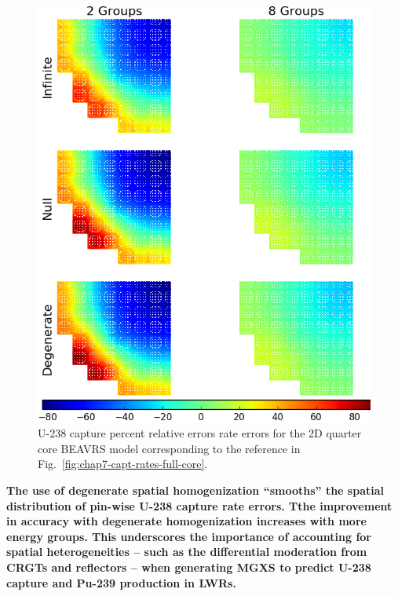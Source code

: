 \begin{figure}[h!]
\centering
\includegraphics[width=\linewidth]{figures/quantification/full-core/capt-err}
\caption[U-238 capture rate errors for the 2D quarter core \ac{BEAVRS} model]{U-238 capture percent relative errors rate errors for the 2D quarter core \ac{BEAVRS} model corresponding to the reference in Fig.~\ref{fig:chap7-capt-rates-full-core}.}
\label{fig:chap8-full-core-capt-err}
\end{figure}

\clearpage

\begin{emphbox}
\textbf{The use of degenerate spatial homogenization ``smooths'' the spatial distribution of pin-wise U-238 capture rate errors. Tthe improvement in accuracy with degenerate homogenization increases with more energy groups. This underscores the importance of accounting for spatial heterogeneities -- such as the differential moderation from \acp{CRGT} and reflectors -- when generating \ac{MGXS} to predict U-238 capture and Pu-239 production in \acp{LWR}.}
\end{emphbox}


